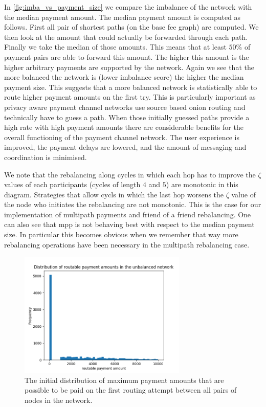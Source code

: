 \documentclass[a4paper]{paper}
\begin{document}
In \cref{fig:imba_vs_payment_size} we compare the imbalance of the network with the median payment amount.
The median payment amount is computed as follows.
First all pair of shortest paths (on the base fee graph) are computed.
We then look at the amount that could actually be forwarded through each path.
Finally we take the median of those amounts.
This means that at least $50\%$ of payment pairs are able to forward this amount.
The higher this amount is the higher arbitrary payments are supported by the network.
Again we see that the more balanced the network is (lower imbalance score) the higher the median payment size.
This suggests that a more balanced network is statistically able to route higher payment amounts on the first try.
This is particularly important as privacy aware payment channel networks use source based onion routing and technically have to guess a path.
When those initially guessed paths provide a high rate with high payment amounts there are considerable benefits for the overall functioning of the payment channel network. 
The user experience is improved, the payment delays are lowered, and the amount of messaging and coordination is minimised.

We note that the rebalancing along cycles in which each hop has to improve the $\zeta$ values of each participants (cycles of length $4$ and $5$) are monotonic in this diagram.
Strategies that allow cycls in which the last hop worsens the $\zeta$ value of the node who initiates the rebalancing are not monotonic.
This is the case for our implementation of multipath payments and friend of a friend rebalancing.
One can also see that mpp is not behaving best with respect to the median payment size.
In particular this becomes obvious when we remember that way more rebalancing operations have been necessary in the multipath rebalancing case.

\begin{figure}
 \centering
 \includegraphics[width=8cm]{code/results/routabilityTest/paymentamtUnbalanced.png}
 \caption{The initial distribution of maximum payment amounts that are possible to be paid on the first routing attempt between all pairs of nodes in the network.}
 \label{fig:paymentUnbalanced}
\end{figure}
\end{document}
